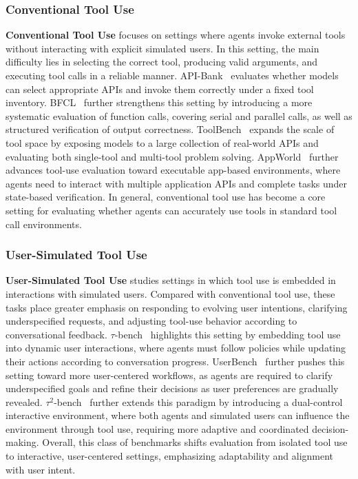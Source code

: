\subsubsection{Conventional Tool Use}
\label{Conventional Tool Use}
\textbf{Conventional Tool Use} focuses on settings where agents invoke external tools without interacting with explicit simulated users. In this setting, the main difficulty lies in selecting the correct tool, producing valid arguments, and executing tool calls in a reliable manner. API-Bank~\cite{API-Bank} evaluates whether models can select appropriate APIs and invoke them correctly under a fixed tool inventory. BFCL~\cite{BFCL} further strengthens this setting by introducing a more systematic evaluation of function calls, covering serial and parallel calls, as well as structured verification of output correctness.  %
ToolBench~\cite{ToolBench} expands the scale of tool space by exposing models to a large collection of real-world APIs and evaluating both single-tool and multi-tool problem solving. AppWorld~\cite{AppWorld2024} further advances tool-use evaluation toward executable app-based environments, where agents need to interact with multiple application APIs and complete tasks under state-based verification. In general, conventional tool use has become a core setting for evaluating whether agents can accurately use tools in standard tool call environments.

\subsubsection{User-Simulated Tool Use}
\label{User-Simulated Tool Use}
\textbf{User-Simulated Tool Use} studies settings in which tool use is embedded in interactions with simulated users. Compared with conventional tool use, these tasks place greater emphasis on responding to evolving user intentions, clarifying underspecified requests, and adjusting tool-use behavior according to conversational feedback. $\tau$-bench~\cite{tau-bench} highlights this setting by embedding tool use into dynamic user interactions, where agents must follow policies while updating their actions according to conversation progress. UserBench~\cite{UserBench} further pushes this setting toward more user-centered workflows, as agents are required to clarify underspecified goals and refine their decisions as user preferences are gradually revealed. $\tau^2$-bench~\cite{tau2-bench} further extends this paradigm by introducing a dual-control interactive environment, where both agents and simulated users can influence the environment through tool use, requiring more adaptive and coordinated decision-making. Overall, this class of benchmarks shifts evaluation from isolated tool use to interactive, user-centered settings, emphasizing adaptability and alignment with user intent.

